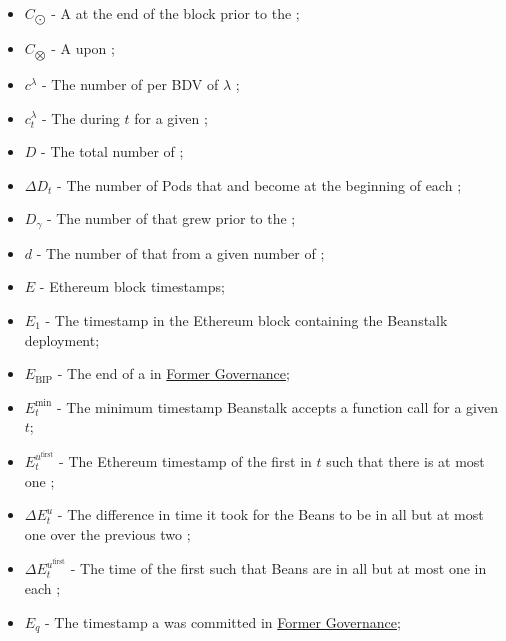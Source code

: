 \documentclass[class=article, crop=false]{standalone}
\begin{document}
\begin{itemize}[topsep=0pt, itemsep=3pt,leftmargin=16pt]
    \item[] $C_{\bigodot}$ - \hypertarget{ht30}{A   at the end of the block prior to the };
    \item[] $C_{\bigotimes}$ - \hypertarget{ht31}{A   upon };
    \item[] $c^{\lambda}$ - \hypertarget{ht32}{The number of  per BDV of $\lambda$ };
    \item[] $c_{t}^{\lambda}$ - \hypertarget{ht33}{The  during $t$ for a given };
    \item[] $D$ - \hypertarget{ht38}{The total number of };
    \item[] $\Delta D_t$ - \hypertarget{ht53}{The number of Pods that  and become  at the beginning of each };
    \item[] $D_{\gamma}$ - \hypertarget{ht39}{The number of  that grew prior to the };
    \item[] $d$ - \hypertarget{ht40}{The number of  that  from a given number of  \Bean};
    \item[] $E$ - \hypertarget{ht69}{Ethereum block timestamps};
    \item[] $E_1$ - \hypertarget{ht70}{The timestamp in the Ethereum block containing the Beanstalk deployment};
    \item[] $E_{\text{BIP}}$ - \hypertarget{ht71}{The end of a   in \hyperlink{subsection.14.3}{Former Governance}};
    \item[] $E_{t}^{\text{min}}$ - \hypertarget{ht75}{The minimum timestamp Beanstalk accepts a  function call for a given $t$};
    \item[] $E_{t}^{u^{\text{first}}}$ - \hypertarget{ht76}{The Ethereum timestamp of the first  in $t$ such that there is at most one };
    \item[] $\Delta E_{t}^{u}$ - \hypertarget{ht56}{The difference in time it took for the Beans to be  in all but at most one  over the previous two };
    \item[] $\Delta E_{t}^{u^{\text{first}}}$ - \hypertarget{ht57}{The time of the first  such that Beans are  in all but at most one  in each };
    \item[] $E_q$ - \hypertarget{ht77}{The timestamp a  was committed in \hyperlink{subsection.14.3}{Former Governance}};

\end{itemize}
\end{document}

